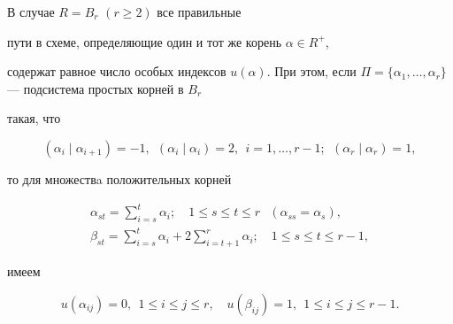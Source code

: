 \begin{lem}


В случае $R=B_r$ $(r\ge 2)$ все правильные


пути в схеме, определяющие один и тот же корень $\alpha\in R^+$,


содержат равное число особых индексов $u(\alpha )$. При этом, если $\Pi


=\{\alpha_1,\dotsc,\alpha_r\}$ --- подсистема простых корней в $B_r$


такая, что


$$


(\alpha_i\mid \alpha_{i+1})=-1,


\ \ (\alpha_i\mid \alpha_i)=2,\ \ i=1,\dotsc,r-1;


\ \ (\alpha_r\mid \alpha_r)=1,


$$


то для множествa положительных корней


\begin{gather*}


\alpha_{st}=\sum\limits_{i=s}^t\alpha_i;\quad 1\le s\le t \le r\;


\ \ (\alpha_{ss}=\alpha_s), \\


\beta_{st}=\sum\limits_{i=s}^t\alpha_i+


2\sum\limits_{i=t+1}^r\alpha_i;\quad 1\le s\le t \le r-1,


\end{gather*}


имеем


\begin{equation}


u(\alpha_{ij})=0,\ \ 1\le i\le j \le r,\quad u(\beta_{ij})=1,\ \


1\le i\le j \le r-1.


\end{equation}


\end{lem}






